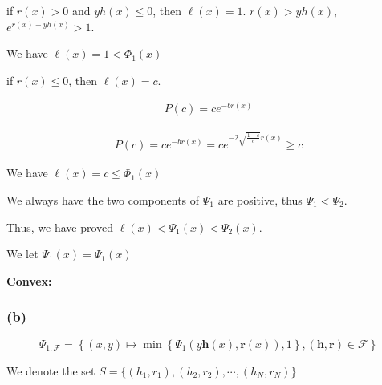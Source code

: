 \documentclass{article}
\begin{document}
if $r(x) > 0$ and $y h(x) \leq 0$, then $\ell(x) = 1$.  $r(x)> yh(x)$, $e^{r(x)-y h(x)} >1$.

We have $\ell(x) = 1 < \Phi_{1}(x)$

if $r(x) \leq 0$, then $\ell(x) = c$.

\begin{align}
    P(c) = c e^{-b r(x)}
\end{align}


\begin{align}
    P(c) = c e^{-b r(x)} = c e^{-2 \sqrt{\frac{1-c}{c}} r(x)} \geq c
\end{align}

We have $\ell(x) = c \leq \Phi_1(x)$

We always have the two components of $\Psi_{1}$ are positive, thus $\Psi_{1} < \Psi_{2}$.

Thus, we have proved $\ell(x) < \Psi_1(x) < \Psi_2(x)$.

We let $\Psi_1(x) = \Psi_1(x)$

\textbf{Convex:}











\subsubsection*{(b)}

$$
    \Psi_{1, \mathcal{F}}=\left\{(x, y) \mapsto \min \left\{\Psi_{1}(y \mathbf{h}(x), \mathbf{r}(x)), 1\right\},(\mathbf{h}, \mathbf{r}) \in \mathcal{F}\right\}
$$


We denote the set $S = \{(h_1, r_1), (h_2, r_2), \cdots, (h_N, r_N)\}$
\end{document}

